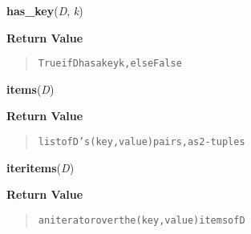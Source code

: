     \begin{boxedminipage}{\textwidth}

    \raggedright \textbf{has\_key}(\textit{D}, \textit{k})

      \textbf{Return Value}
      \begin{quote}
\begin{alltt}
True if D has a key k, else False
\end{alltt}

      \end{quote}

    \vspace{1ex}

    \end{boxedminipage}

    \label{dict:items}

    \vspace{0.5ex}

    \begin{boxedminipage}{\textwidth}

    \raggedright \textbf{items}(\textit{D})

      \textbf{Return Value}
      \begin{quote}
\begin{alltt}
list of D's (key, value) pairs, as 2-tuples
\end{alltt}

      \end{quote}

    \vspace{1ex}

    \end{boxedminipage}

    \label{dict:iteritems}

    \vspace{0.5ex}

    \begin{boxedminipage}{\textwidth}

    \raggedright \textbf{iteritems}(\textit{D})

      \textbf{Return Value}
      \begin{quote}
\begin{alltt}
an iterator over the (key, value) items of D
\end{alltt}

      \end{quote}

    \vspace{1ex}

    \end{boxedminipage}

